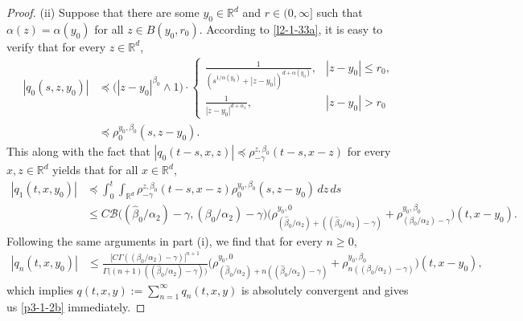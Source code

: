 \documentclass[a4paper,11pt]{amsart}
\renewcommand{\le}{\leqslant}
\renewcommand{\ge}{\geqslant}
\newcommand{\R}{\mathds R}
\newcommand{\B}{\beta}
\newcommand{\p}{\preceq}
\newcommand{\A}{\alpha}
\newcommand{\G}{\gamma}
\def\wh{\widehat}
\theoremstyle{definition}
\begin{document}
\begin{proof}
(ii) Suppose that there are some $y_0\in \R^d$ and $r\in(0,\infty]$ such that $\alpha(z)=\alpha(y_0)$ for all $z\in B(y_0,r_0)$.
According to \eqref{l2-1-33a}, it is easy to verify that for every $z \in \R^d$,
\begin{equation}\label{p3-1-7a}
\begin{split}
|q_0(s,z,y_0)|&\p \big(|z-y_0|^{\beta_0}\wedge 1\big)\cdot
\begin{cases}
\frac{1}{(s^{{1/\A(y_0)}}+|z-y_0|)^{d+\A(y_0)}},& |z-y_0|\le r_0,\\
\frac{1}{|z-y_0|^{d+\A_1}},&|z-y_0|> r_0
\end{cases}\\
&\p \rho^{y_0,\B_0}_0(s,z-y_0).
\end{split}
\end{equation}
This along with the fact that $|q_0(t-s,x,z)|\p \rho^{z,\B_0}_{-\G}(t-s,x-z)$ for every $x,z\in \R^d$ yields that for all $x\in \R^d$,
\begin{align*}
|q_1(t,x,y_0)|&\p \int_0^t\int_{\R^d}\rho^{z,\B_0}_{-\G}(t-s,x-z)\rho^{y_0,\B_0}_0(s,z-y_0)\,dz\,ds\\
&\le C\mathscr{B}\big(({\wh\B_0}/{\A_2})-\G,({ \B_0}/{\A_2})-\G\big)
\big(\rho^{y_0,0}_{({\wh \B_0}/{\A_2})+(({\wh \B_0}/{\A_2})-\G)}+\rho^{y_0,\B_0}_{({\B_0}/{\A_2})-\G}\big)(t,x-y_0).
\end{align*}
Following the same arguments in part (i), we find that for every $n \ge 0$,
\begin{align*} |q_n(t,x,y_0)|
&\le \frac{\big[C \Gamma(({\beta_0}/{\A_2})-\gamma )\big]^{n+1}}{\Gamma\big((n+1)(({\wh \beta_0}/{\A_2})-\gamma)\big)}
\Big(\rho_{({\wh \B_0}/{\A_2})+n(({\wh\B_0}/{\A_2})-\gamma)}^{y_0,0}+\rho_{n(({ \B_0}/{\A_2})-\gamma)}^{y_0,\B_0} \Big)(t,x-y_0),\end{align*}
which implies $q(t,x,y):=\sum_{n=1}^{\infty}q_n(t,x,y)$ is absolutely convergent and gives us \eqref{p3-1-2b} immediately.


\end{proof}
\end{document}
